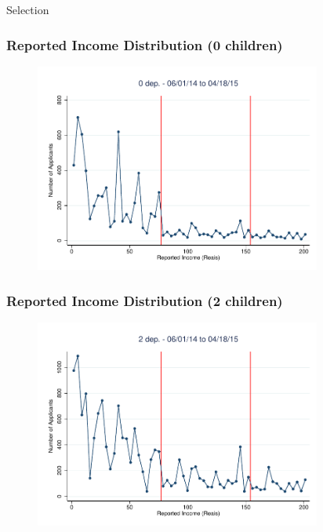 \documentclass[xcolor=pdftex,dvipsnames,table]{beamer}
\begin{document}
\begin{frame}
\begin{table}[htbp]
  \centering
  \caption{Selection}
    
  \label{tab_selection}%
\end{table}%
\end{frame}

\begin{frame}[label=ybar0]
\frametitle{Reported Income Distribution (0 children)}
\begin{figure}[H]
\begin{center}
\includegraphics[height=2.7in]{Dom_060114_non_0_bin3p5.pdf}
\end{center}
\end{figure}
\hyperlink{ybar0_sel}{}
\end{frame}

\begin{frame}[label=ybar2]
\frametitle{Reported Income Distribution (2 children)}
\begin{figure}[H]
\begin{center}
\includegraphics[height=2.7in]{Dom_060114_non_2_bin3p5.pdf}
\end{center}
\end{figure}
\hyperlink{ybar2_sel}{}
\end{frame}
\end{document}
